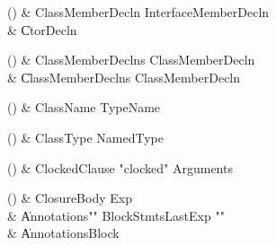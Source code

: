 \begin{bbgrammarappendix}{3.4in}

() & ClassMemberDecln \label{prod:ClassMemberDecln}  \: InterfaceMemberDecln  \\

 &    \| CtorDecln \\

\end{bbgrammarappendix}

\begin{bbgrammarappendix}{3.3in}

() & ClassMemberDeclns \label{prod:ClassMemberDeclns}  \: ClassMemberDecln  \\

 &    \| ClassMemberDeclns ClassMemberDecln \\

\end{bbgrammarappendix}

\begin{bbgrammarappendix}{4.1in}

() & ClassName \label{prod:ClassName}  \: TypeName  \\


\end{bbgrammarappendix}

\begin{bbgrammarappendix}{4.1in}

() & ClassType \label{prod:ClassType}  \: NamedType  \\


\end{bbgrammarappendix}

\begin{bbgrammarappendix}{3.7in}

() & ClockedClause \label{prod:ClockedClause}  \: \xcd"clocked" Arguments  \\


\end{bbgrammarappendix}

\begin{bbgrammarappendix}{3.9in}

() & ClosureBody \label{prod:ClosureBody}  \: Exp  \\

 &    \| Annotations\opt \xcd"{" BlockStmts\opt LastExp \xcd"}" \\
 &    \| Annotations\opt Block \\

\end{bbgrammarappendix}

